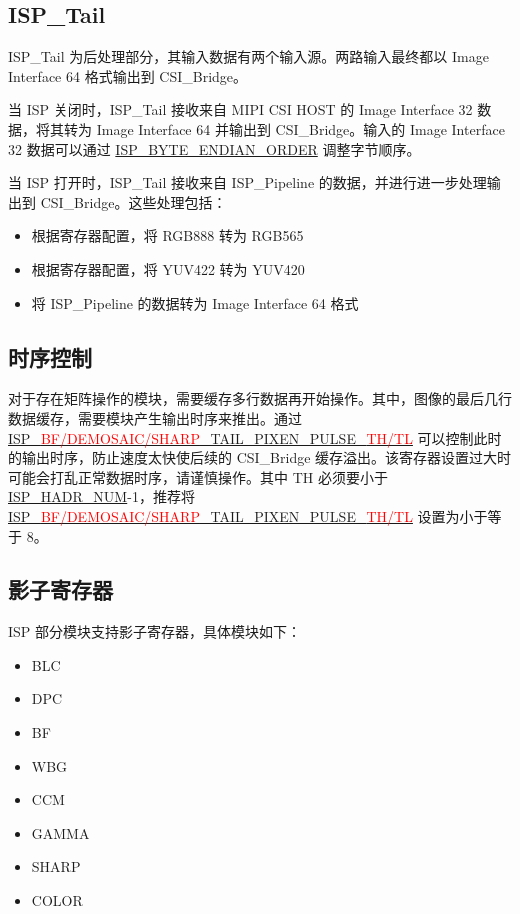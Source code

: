 \documentclass[main\_\_CN.tex]{subfiles}
\begin{document}
\subsection{ISP\_Tail}
ISP\_Tail 为后处理部分，其输入数据有两个输入源。两路输入最终都以 Image Interface 64 格式输出到 CSI\_Bridge。

当 ISP 关闭时，ISP\_Tail 接收来自 MIPI CSI HOST 的 Image Interface 32 数据，将其转为 Image Interface 64 并输出到 CSI\_Bridge。输入的 Image Interface 32 数据可以通过
\hyperref[fielddesc:ISPBYTEENDIANORDER]{ISP\_BYTE\_ENDIAN\_ORDER} 调整字节顺序。

当 ISP 打开时，ISP\_Tail 接收来自 ISP\_Pipeline 的数据，并进行进一步处理输出到 CSI\_Bridge。这些处理包括：
\begin{itemize}
    \item 根据寄存器配置，将 RGB888 转为 RGB565
    \item 根据寄存器配置，将 YUV422 转为 YUV420
    \item 将 ISP\_Pipeline 的数据转为 Image Interface 64 格式
\end{itemize}


\subsection{时序控制}
对于存在矩阵操作的模块，需要缓存多行数据再开始操作。其中，图像的最后几行数据缓存，需要模块产生输出时序来推出。通过 \hyperref[fielddesc:ISPBFTAILPIXENPULSETH]{ISP\_\textcolor{red}{BF/DEMOSAIC/SHARP}\_TAIL\_PIXEN\_PULSE\_\textcolor{red}{TH/TL}} 可以控制此时的输出时序，防止速度太快使后续的 CSI\_Bridge 缓存溢出。该寄存器设置过大时可能会打乱正常数据时序，请谨慎操作。其中 TH 必须要小于 \hyperref[fielddesc:ISPHADRNUM]{ISP\_HADR\_NUM}-1，推荐将 \hyperref[fielddesc:ISPBFTAILPIXENPULSETH]{ISP\_\textcolor{red}{BF/DEMOSAIC/SHARP}\_TAIL\_PIXEN\_PULSE\_\textcolor{red}{TH/TL}} 设置为小于等于 8。


\subsection{影子寄存器}
ISP 部分模块支持影子寄存器，具体模块如下：
\begin{itemize}
    \item BLC
    \item DPC
    \item BF
    \item WBG
    \item CCM
    \item GAMMA
    \item SHARP
    \item COLOR
\end{itemize}
\end{document}
